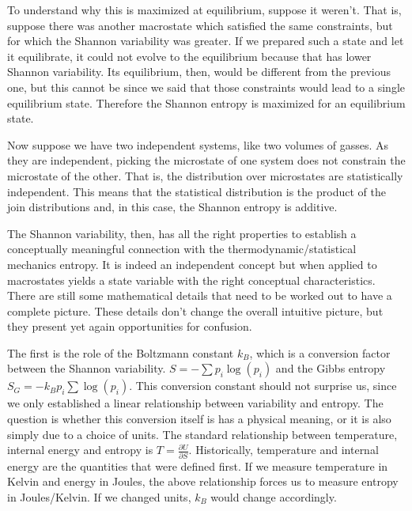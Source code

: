 \documentclass{article}
\begin{document}
To understand why this is maximized at equilibrium, suppose it weren't. That is, suppose there was another macrostate which satisfied the same constraints, but for which the Shannon variability was greater. If we prepared such a state and let it equilibrate, it could not evolve to the equilibrium because that has lower Shannon variability. Its equilibrium, then, would be different from the previous one, but this cannot be since we said that those constraints would lead to a single equilibrium state. Therefore the Shannon entropy is maximized for an equilibrium state.

Now suppose we have two independent systems, like two volumes of gasses. As they are independent, picking the microstate of one system does not constrain the microstate of the other. That is, the distribution over microstates are statistically independent. This means that the statistical distribution is the product of the join distributions and, in this case, the Shannon entropy is additive.

The Shannon variability, then, has all the right properties to establish a conceptually meaningful connection with the thermodynamic/statistical mechanics entropy. It is indeed an independent concept but when applied to macrostates yields a state variable with the right conceptual characteristics. There are still some mathematical details that need to be worked out to have a complete picture. These details don't change the overall intuitive picture, but they present yet again opportunities for confusion.

The first is the role of the Boltzmann constant $k_B$, which is a conversion factor between the Shannon variability. $S = - \sum p_i \log(p_i)$ and the Gibbs entropy $S_G = - k_B p_i \sum \log(p_i)$. This conversion constant should not surprise us, since we only established a linear relationship between variability and entropy. The question is whether this conversion itself is has a physical meaning, or it is also simply due to a choice of units. The standard relationship between temperature, internal energy and entropy is $T = \frac{\partial U}{\partial S}$. Historically, temperature and internal energy are the quantities that were defined first. If we measure temperature in Kelvin and energy in Joules, the above relationship forces us to measure entropy in Joules/Kelvin. If we changed units, $k_B$ would change accordingly.
\end{document}
